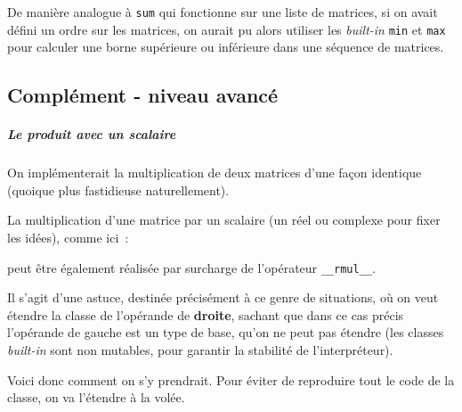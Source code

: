     De manière analogue à \texttt{sum} qui fonctionne sur une liste de
matrices, si on avait défini un ordre sur les matrices, on aurait pu
alors utiliser les \emph{built-in} \texttt{min} et \texttt{max} pour
calculer une borne supérieure ou inférieure dans une séquence de
matrices.

    \hypertarget{compluxe9ment---niveau-avancuxe9}{%
\subsection{Complément - niveau
avancé}\label{compluxe9ment---niveau-avancuxe9}}

    \hypertarget{le-produit-avec-un-scalaire}{%
\subparagraph{Le produit avec un
scalaire}\label{le-produit-avec-un-scalaire}}

    On implémenterait la multiplication de deux matrices d'une façon
identique (quoique plus fastidieuse naturellement).

La multiplication d'une matrice par un scalaire (un réel ou complexe
pour fixer les idées), comme ici~:

\begin{Shaded}
\begin{Highlighting}[frame=lines,framerule=0.6mm,rulecolor=\color{asisframecolor}]
\OperatorTok{=}\OperatorTok{*}
\end{Highlighting}
\end{Shaded}

peut être également réalisée par surcharge de l'opérateur
\texttt{\_\_rmul\_\_}.

Il s'agit d'une astuce, destinée précisément à ce genre de situations,
où on veut étendre la classe de l'opérande de \textbf{droite}, sachant
que dans ce cas précis l'opérande de gauche est un type de base, qu'on
ne peut pas étendre (les classes \emph{built-in} sont non mutables, pour
garantir la stabilité de l'interpréteur).

Voici donc comment on s'y prendrait. Pour éviter de reproduire tout le
code de la classe, on va l'étendre à la volée.

